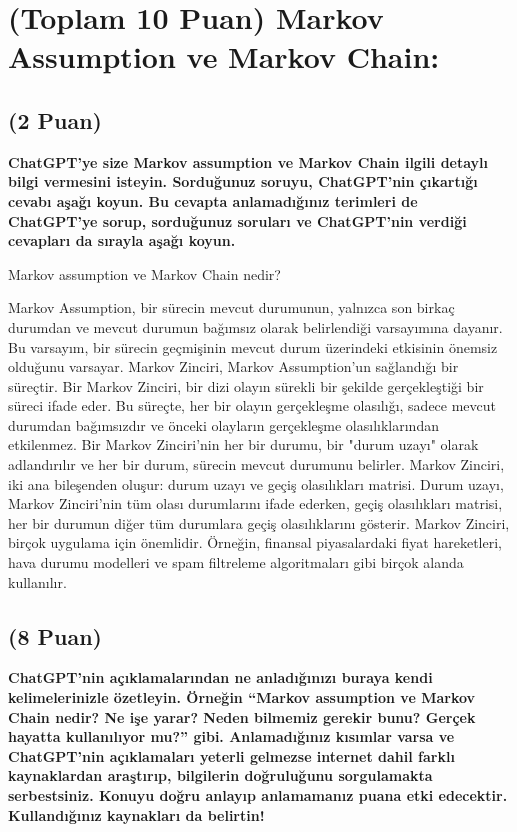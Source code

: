 \documentclass[11pt]{article}
\begin{document}
\section{(Toplam 10 Puan) Markov Assumption ve Markov Chain:}

\subsection{(2 Puan)} \textbf{ChatGPT’ye size Markov assumption ve Markov Chain ilgili detaylı bilgi vermesini isteyin. Sorduğunuz soruyu, ChatGPT'nin çıkartığı cevabı aşağı koyun. Bu cevapta anlamadığınız terimleri de ChatGPT’ye sorup, sorduğunuz soruları ve ChatGPT’nin verdiği cevapları da sırayla aşağı koyun.}

Markov assumption ve Markov Chain nedir?

Markov Assumption, bir sürecin mevcut durumunun, yalnızca son birkaç durumdan ve mevcut durumun bağımsız olarak belirlendiği varsayımına dayanır. Bu varsayım, bir sürecin geçmişinin mevcut durum üzerindeki etkisinin önemsiz olduğunu varsayar.
Markov Zinciri, Markov Assumption'un sağlandığı bir süreçtir. Bir Markov Zinciri, bir dizi olayın sürekli bir şekilde gerçekleştiği bir süreci ifade eder. Bu süreçte, her bir olayın gerçekleşme olasılığı, sadece mevcut durumdan bağımsızdır ve önceki olayların gerçekleşme olasılıklarından etkilenmez. Bir Markov Zinciri'nin her bir durumu, bir "durum uzayı" olarak adlandırılır ve her bir durum, sürecin mevcut durumunu belirler.
Markov Zinciri, iki ana bileşenden oluşur: durum uzayı ve geçiş olasılıkları matrisi. Durum uzayı, Markov Zinciri'nin tüm olası durumlarını ifade ederken, geçiş olasılıkları matrisi, her bir durumun diğer tüm durumlara geçiş olasılıklarını gösterir.
Markov Zinciri, birçok uygulama için önemlidir. Örneğin, finansal piyasalardaki fiyat hareketleri, hava durumu modelleri ve spam filtreleme algoritmaları gibi birçok alanda kullanılır.

\subsection{(8 Puan)} \textbf{ChatGPT’nin açıklamalarından ne anladığınızı buraya kendi kelimelerinizle özetleyin. Örneğin ``Markov assumption ve Markov Chain nedir? Ne işe yarar? Neden bilmemiz gerekir bunu? Gerçek hayatta kullanılıyor mu?'' gibi. Anlamadığınız kısımlar varsa ve ChatGPT’nin açıklamaları yeterli gelmezse internet dahil farklı kaynaklardan araştırıp, bilgilerin doğruluğunu sorgulamakta serbestsiniz. Konuyu doğru anlayıp anlamamanız puana etki edecektir. Kullandığınız kaynakları da belirtin!}
\end{document}
